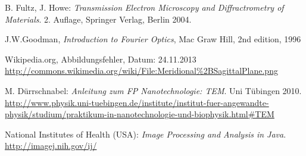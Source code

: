 \documentclass[a4paper, parskip=half, 12pt, bibliography=totocnumbered]{scrartcl}
\begin{document}





\begin{thebibliography}{10}
 B. Fultz, J. Howe: \emph{Transmission Electron Microscopy and Diffractrometry of Materials}. 2. Auflage, Springer Verlag, Berlin 2004.

 J.W.Goodman, \emph{Introduction to Fourier Optics}, Mac Graw Hill, 2nd edition, 1996

 Wikipedia.org, Abbildungsfehler, Datum: 24.11.2013\\
\url{http://commons.wikimedia.org/wiki/File:Meridional%2BSagittalPlane.png}

 M. Dürrschnabel: \emph{Anleitung zum FP Nanotechnologie: TEM}. Uni Tübingen 2010.\\
\url{http://www.physik.uni-tuebingen.de/institute/institut-fuer-angewandte-physik/studium/praktikum-in-nanotechnologie-und-biophysik.html#TEM}

 National Institutes of Health (USA): \emph{Image Processing and Analysis in Java}.\\
\url{http://imagej.nih.gov/ij/}
\end{thebibliography}
\end{document}
